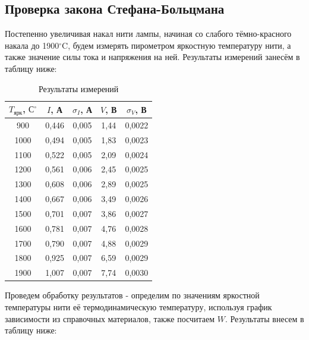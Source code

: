 \documentclass[a4paper,12pt]{extarticle}
\begin{document}
\subsection*{Проверка закона Стефана-Больцмана}
Постепенно увеличивая накал нити лампы, начиная со слабого тёмно-красного накала до 1900$^{\circ}$C, будем измерять пирометром яркостную температуру нити, а также значение силы тока и напряжения на ней. Результаты измерений занесём в таблицу ниже:
\begin{table}[H]
\centering
\begin{tabular}{|c|c|c|c|c|}
\hline
$T_{\text{ярк}}$, $\text{С}^{\circ}$ & $I$, А & $\sigma_I$, А & $V$, В & $\sigma_V$, В \\ \hline
900        & 0,446& 0,005 & 1,44& 0,0022 \\ \hline
1000       & 0,494& 0,005 & 1,83& 0,0023 \\ \hline
1100       & 0,522& 0,005 & 2,09& 0,0024 \\ \hline
1200       & 0,561& 0,006 & 2,45& 0,0025 \\ \hline
1300       & 0,608& 0,006 & 2,89& 0,0025 \\ \hline
1400       & 0,667& 0,006 & 3,49& 0,0026 \\ \hline
1500       & 0,701& 0,007 & 3,86& 0,0027 \\ \hline
1600       & 0,781& 0,007 & 4,76& 0,0028 \\ \hline
1700       & 0,790& 0,007 & 4,88& 0,0029 \\ \hline
1800       & 0,925& 0,007 & 6,59& 0,0029 \\ \hline
 1900& 1,007& 0,007 & 7,74&0,0030\\\hline
\end{tabular}
\caption{Результаты измерений}
\end{table}
Проведем обработку результатов - определим по значениям яркостной температуры нити её термодинамическую температуру, используя график зависимости из справочных материалов, также посчитаем $W$. Результаты внесем в таблицу ниже:
\end{document}

